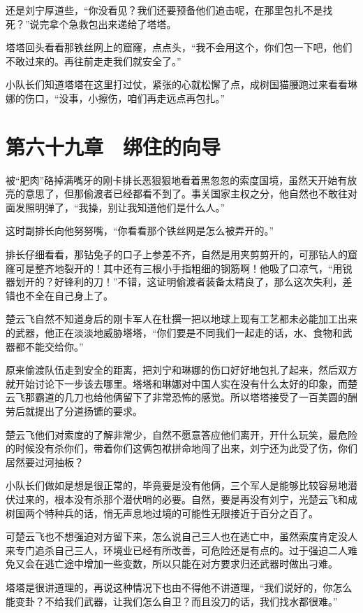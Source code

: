 还是刘宁厚道些，“你没看见？我们还要预备他们追击呢，在那里包扎不是找死？”说完拿个急救包出来递给了塔塔。

塔塔回头看看那铁丝网上的窟窿，点点头，“我不会用这个，你们包一下吧，他们不敢过来的。再往前走走我们就安全了。”

小队长们知道塔塔在这里打过仗，紧张的心就松懈了点，成树国猫腰跑过来看看琳娜的伤口，“没事，小擦伤，咱们再走远点再包扎。”

\section{第六十九章　绑住的向导}

被“肥肉”硌掉满嘴牙的刚卡排长恶狠狠地看着黑忽忽的索度国境，虽然天开始有放亮的意思了，但那偷渡者已经都看不到了。事关国家主权之分，他自然也不敢往对面发照明弹了，“我操，别让我知道他们是什么人。”

这时副排长向他努努嘴，“你看看那个铁丝网是怎么被弄开的。”

排长仔细看看，那钻兔子的口子上参差不齐，自然是用夹剪剪开的，可那钻人的窟窿可是整齐地裂开的！其中还有三根小手指粗细的钢筋啊！他吸了口凉气，“用锐器划开的？好锋利的刀！”不错，这证明偷渡者装备太精良了，那么这次失利，差错也不全在自己身上了。

楚云飞自然不知道身后的刚卡军人在杜撰一把以地球上现有工艺都未必能加工出来的武器，他正在淡淡地威胁塔塔，“你们要是不同我们一起走的话，水、食物和武器都不能交给你。”

原来偷渡队伍走到安全的距离，把刘宁和琳娜的伤口好好地包扎了起来，然后双方就开始讨论下一步该去哪里。塔塔和琳娜对中国人实在没有什么太好的印象，而楚云飞那霸道的几刀也给他俩留下了非常恐怖的感觉。所以塔塔接受了一百美圆的酬劳后就提出了分道扬镳的要求。

楚云飞他们对索度的了解非常少，自然不愿意答应他们离开，开什么玩笑，最危险的时候没有杀你们，带着你们这俩包袱拼命地闯了出来，刘宁还为此受了伤，你们居然要过河抽板？

小队长们做如是想是很正常的，毕竟要是没有他俩，三个军人是能够比较容易地潜伏过来的，根本没有杀那个潜伏哨的必要。自然，要是再没有刘宁，光楚云飞和成树国两个特种兵的话，悄无声息地过境的可能性无限接近于百分之百了。

可楚云飞也不想强迫对方留下来，怎么说自己三人也在逃亡中，虽然索度肯定没人来专门追杀自己三人，环境业已经有所改善，可危险还是有点的。过于强迫二人难免又会在逃亡途中增加一些变数，所以只能在对方要求归还武器时做出刁难。

塔塔是很讲道理的，再说这种情况下也由不得他不讲道理，“我们说好的，你怎么能变卦？不给我们武器，让我们怎么自卫？而且没刀的话，我们找水都很难。”

